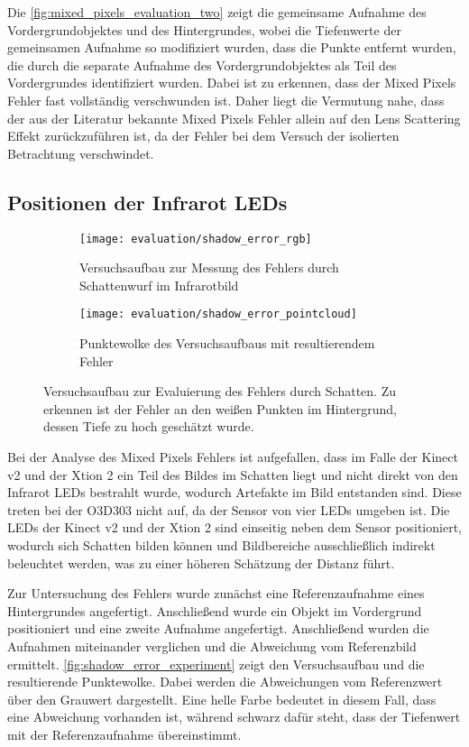 \documentclass[thesis.tex]{subfiles}
\begin{document}
Die \autoref{fig:mixed_pixels_evaluation_two} zeigt die gemeinsame Aufnahme des Vordergrundobjektes und des Hintergrundes, wobei die Tiefenwerte der gemeinsamen Aufnahme so modifiziert wurden, dass die Punkte entfernt wurden, die durch die separate Aufnahme des Vordergrundobjektes als Teil des Vordergrundes identifiziert wurden. Dabei ist zu erkennen, dass der Mixed Pixels Fehler fast vollständig verschwunden ist. Daher liegt die Vermutung nahe, dass der aus der Literatur bekannte Mixed Pixels Fehler allein auf den Lens Scattering Effekt zurückzuführen ist, da der Fehler bei dem Versuch der isolierten Betrachtung verschwindet.
%
\subsection{Positionen der Infrarot LEDs}\label{sec:analysis_led_position}
%
\begin{figure}[h!]
\centering
\begin{subfigure}[b]{0.49\textwidth}
    \texttt{[image: evaluation/shadow\_error\_rgb]}
    \caption{Versuchsaufbau zur Messung des Fehlers durch Schattenwurf im Infrarotbild}
\end{subfigure}
\begin{subfigure}[b]{0.49\textwidth}
    \texttt{[image: evaluation/shadow\_error\_pointcloud]}
    \caption{Punktewolke des Versuchsaufbaus mit resultierendem Fehler}
\end{subfigure}
\caption{Versuchsaufbau zur Evaluierung des Fehlers durch Schatten. Zu erkennen ist der Fehler an den weißen Punkten im Hintergrund, dessen Tiefe zu hoch geschätzt wurde.}
\label{fig:shadow_error_experiment}
\end{figure}

Bei der Analyse des Mixed Pixels Fehlers ist aufgefallen, dass im Falle der Kinect v2 und der Xtion 2 ein Teil des Bildes im Schatten liegt und nicht direkt von den Infrarot LEDs bestrahlt wurde, wodurch Artefakte im Bild entstanden sind. Diese treten bei der O3D303 nicht auf, da der Sensor von vier LEDs umgeben ist. Die LEDs der Kinect v2 und der Xtion 2 sind einseitig neben dem Sensor positioniert, wodurch sich Schatten bilden können und Bildbereiche ausschließlich indirekt beleuchtet werden, was zu einer höheren Schätzung der Distanz führt.

Zur Untersuchung des Fehlers wurde zunächst eine Referenzaufnahme eines Hintergrundes  angefertigt. Anschließend wurde ein Objekt im Vordergrund positioniert und eine zweite Aufnahme angefertigt. Anschließend wurden die Aufnahmen miteinander verglichen und die Abweichung vom Referenzbild ermittelt. \autoref{fig:shadow_error_experiment} zeigt  den Versuchsaufbau und die resultierende Punktewolke. Dabei werden die Abweichungen vom Referenzwert über den Grauwert dargestellt. Eine helle Farbe bedeutet in diesem Fall, dass eine Abweichung vorhanden ist, während schwarz dafür steht, dass der Tiefenwert mit der Referenzaufnahme übereinstimmt.
\end{document}
